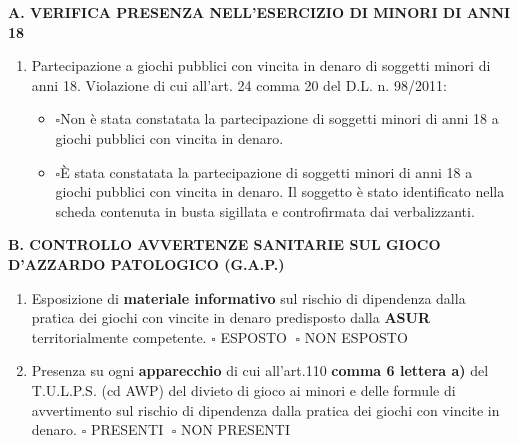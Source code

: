 \documentclass[12pt]{article}
\begin{document}
\begin{center}
    \textbf{A. VERIFICA PRESENZA NELL’ESERCIZIO DI MINORI DI ANNI 18}
\end{center}

\begin{enumerate}[resume]
    \item Partecipazione a giochi pubblici con vincita in denaro di soggetti minori di anni 18. Violazione di cui all’art. 24 comma 20 del D.L. n. 98/2011:
    \begin{itemize}[label={}]
        \item \begin{math}\square\end{math}Non è stata constatata la partecipazione di soggetti minori di anni 18 a giochi pubblici con vincita in denaro.
        \item \begin{math}\square\end{math}È stata constatata la partecipazione di soggetti minori di anni 18 a giochi pubblici con vincita in denaro. Il soggetto è stato  identificato nella scheda contenuta in busta sigillata e controfirmata dai verbalizzanti.    
    \end{itemize}
\end{enumerate}


\begin{center}
    \textbf{B. CONTROLLO AVVERTENZE SANITARIE SUL GIOCO D’AZZARDO PATOLOGICO (G.A.P.)}
\end{center}
\begin{enumerate}[resume]
    \item Esposizione di \textbf{materiale informativo} sul rischio di dipendenza dalla pratica dei giochi con vincite in denaro predisposto dalla \textbf{ASUR} territorialmente competente.
    \begin{math} \square\end{math} ESPOSTO \begin{math}\;\square\end{math} NON ESPOSTO
    \item Presenza su ogni \textbf{apparecchio} di cui all’art.110 \textbf{comma 6 lettera a)} del T.U.L.P.S. (cd AWP) del divieto di gioco ai minori e delle formule di avvertimento sul rischio di dipendenza dalla pratica dei giochi con vincite in denaro.
    \begin{math} \square\end{math} PRESENTI \begin{math}\;\square\end{math} NON PRESENTI
\end{enumerate}
\end{document}
